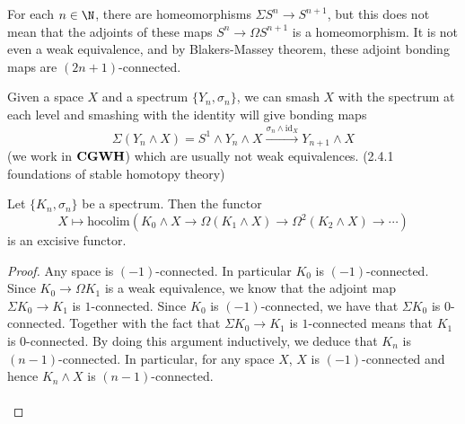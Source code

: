 \documentclass[a4paper]{article}
\begin{document}
\begin{eg}{}{} For each $n\in\N$, there are homeomorphisms $\Sigma S^n\to S^{n+1}$, but this does not mean that the adjoints of these maps $S^n\to\Omega S^{n+1}$ is a homeomorphism. It is not even a weak equivalence, and by Blakers-Massey theorem, these adjoint bonding maps are $(2n+1)$-connected. 
\end{eg}

Given a space $X$ and a spectrum $\{Y_n,\sigma_n\}$, we can smash $X$ with the spectrum at each level and smashing with the identity will give bonding maps $$\Sigma(Y_n\wedge X)=S^1\wedge Y_n\wedge X\overset{\sigma_n\wedge\text{id}_X}{\to} Y_{n+1}\wedge X$$ (we work in $\bold{CGWH}$) which are usually not weak equivalences.  (2.4.1 foundations of stable homotopy theory)

\begin{prp}{}{} Let $\{K_n,\sigma_n\}$ be a spectrum. Then the functor $$X\mapsto\text{hocolim}(K_0\wedge X\rightarrow\Omega(K_1\wedge X)\rightarrow\Omega^2(K_2\wedge X)\rightarrow\cdots)$$ is an excisive functor. \tcbline
\begin{proof}
Any space is $(-1)$-connected. In particular $K_0$ is $(-1)$-connected. Since $K_0\to\Omega K_1$ is a weak equivalence, we know that the adjoint map $\Sigma K_0\to K_1$ is $1$-connected. Since $K_0$ is $(-1)$-connected, we have that $\Sigma K_0$ is $0$-connected. Together with the fact that $\Sigma K_0\to K_1$ is $1$-connected means that $K_1$ is $0$-connected. By doing this argument inductively, we deduce that $K_n$ is $(n-1)$-connected. In particular, for any space $X$, $X$ is $(-1)$-connected and hence $K_n\wedge X$ is $(n-1)$-connected. \\~\\


\end{proof}
\end{prp}
\end{document}
